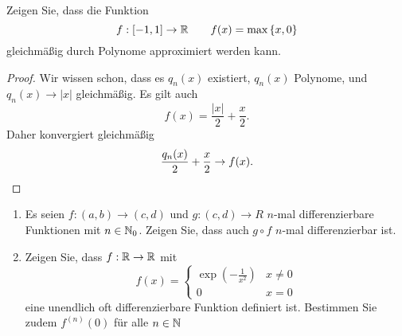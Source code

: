 \begin{Problem}
	Zeigen Sie, dass die Funktion
	\[f:[-1,1]\to\mathbb{R}\qquad f(x)=\text{max}\left\{ x,0 \right\} \]
	gleichmäßig durch Polynome approximiert werden kann.
\end{Problem}
\begin{proof}
	Wir wissen schon, dass es $q_n(x)$ existiert, $q_n(x)$ Polynome, und $q_n(x)\to |x|$ gleichmäßig. Es gilt auch
	\[
	f(x)=\frac{|x|}{2}+\frac{x}{2}
	.\] 
	Daher konvergiert gleichmäßig
	\[
		\frac{q_n(x)}{2}+\frac{x}{2}\to f(x)
	.\qedhere\] 
\end{proof}
\begin{Problem}
\begin{enumerate}[label=\roman*)]
	\item  Es seien $f : (a, b) \to (c, d)$ und $g : (c, d) \to  R$  $n$-mal differenzierbare Funktionen mit $n \in \mathbb{N}_0$. Zeigen Sie, dass auch $g \circ f$ $n$-mal differenzierbar ist.  
	\item Zeigen Sie, dass $f : \mathbb{R} \to \mathbb{R}$ mit
		\[
		f(x)=\begin{cases}
			\exp\left( -\frac{1}{x^2} \right) & x\neq 0\\
			0 & x = 0 
		\end{cases}
		\]
		eine unendlich oft differenzierbare Funktion definiert ist. Bestimmen Sie zudem $f^{(n)}(0)$ für alle $n\in \mathbb{N}$
\end{enumerate}	
\end{Problem}
